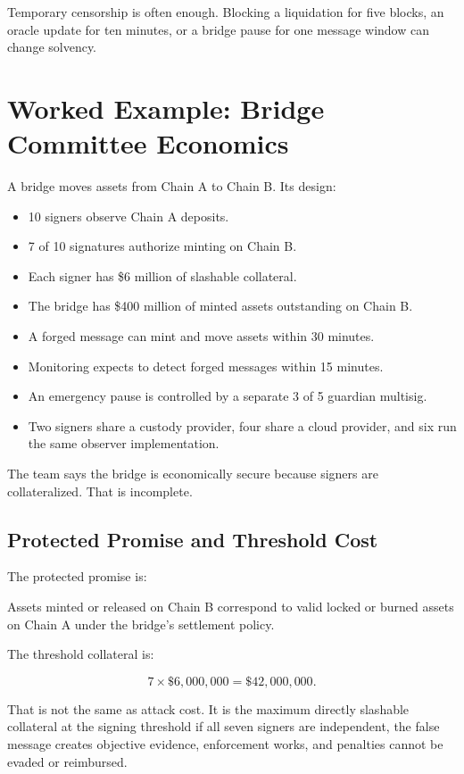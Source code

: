 Temporary censorship is often enough. Blocking a liquidation for five blocks, an oracle update for ten minutes, or a bridge pause for one message window can change solvency.

\section{Worked Example: Bridge Committee Economics}

A bridge moves assets from Chain A to Chain B. Its design:

\begin{itemize}
\item 10 signers observe Chain A deposits.
\item 7 of 10 signatures authorize minting on Chain B.
\item Each signer has \$6 million of slashable collateral.
\item The bridge has \$400 million of minted assets outstanding on Chain B.
\item A forged message can mint and move assets within 30 minutes.
\item Monitoring expects to detect forged messages within 15 minutes.
\item An emergency pause is controlled by a separate 3 of 5 guardian multisig.
\item Two signers share a custody provider, four share a cloud provider, and six run the same observer implementation.
\end{itemize}

The team says the bridge is economically secure because signers are collateralized. That is incomplete.

\subsection{Protected Promise and Threshold Cost}

The protected promise is:

\begin{codeblock}
Assets minted or released on Chain B correspond to valid locked or burned
assets on Chain A under the bridge's settlement policy.
\end{codeblock}

The threshold collateral is:

\[
7 \times \$6{,}000{,}000 = \$42{,}000{,}000.
\]

That is not the same as attack cost. It is the maximum directly slashable collateral at the signing threshold if all seven signers are independent, the false message creates objective evidence, enforcement works, and penalties cannot be evaded or reimbursed.

